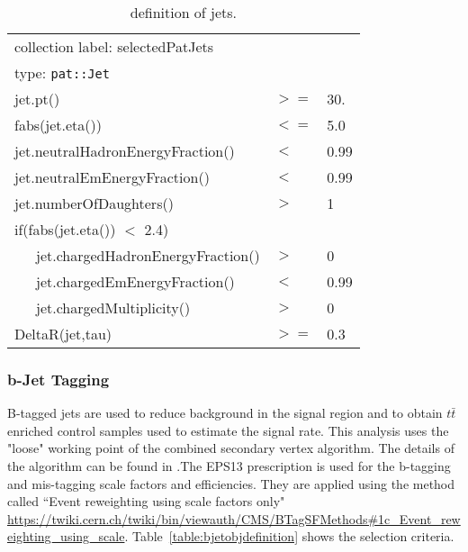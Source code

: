 \begin{table}[htb]
  \caption{definition of jets.}
   \label{table:jetobjdefinition}
  \begin{center}
    \ttfamily\scriptsize\selectfont
    \begin{tabular}{|l|ll|}
      \hline
      \multicolumn{3}{|l|}{ collection label: selectedPatJets}\\
      \multicolumn{3}{|l|}{ type: \texttt{pat::Jet}}\\
      \hline
      jet.pt() & $>=$ & 30. \\
      fabs(jet.eta()) & $<=$ & 5.0 \\
      jet.neutralHadronEnergyFraction() & $<$ &  0.99 \\
      jet.neutralEmEnergyFraction() & $<$ & 0.99 \\
      jet.numberOfDaughters() & $>$& 1 \\
      if(fabs(jet.eta()) $<$ 2.4) && \\
      ~~~jet.chargedHadronEnergyFraction() & $>$ & 0 \\
      ~~~jet.chargedEmEnergyFraction() & $<$ & 0.99 \\
      ~~~jet.chargedMultiplicity() & $>$ & 0 \\
      DeltaR(jet,tau) & $>=$ & 0.3 \\
      \hline
    \end{tabular}
  \end{center}
\end{table}

\subsubsection{b-Jet Tagging}
B-tagged jets are used to reduce \ttbar background in the signal region and to obtain $t\bar{t}$ enriched control samples used to estimate the signal rate. 
This analysis uses the "loose" working point of the combined secondary vertex algorithm.
The details of the algorithm can be found in \cite{CMS:2011cra}.The EPS13 prescription is used for the b-tagging and mis-tagging scale factors and efficiencies. They are applied using the method called ``Event reweighting using scale factors only" \url{https://twiki.cern.ch/twiki/bin/viewauth/CMS/BTagSFMethods\#1c\_Event\_reweighting\_using\_scale}. Table~\ref{table:bjetobjdefinition} shows the selection criteria.

